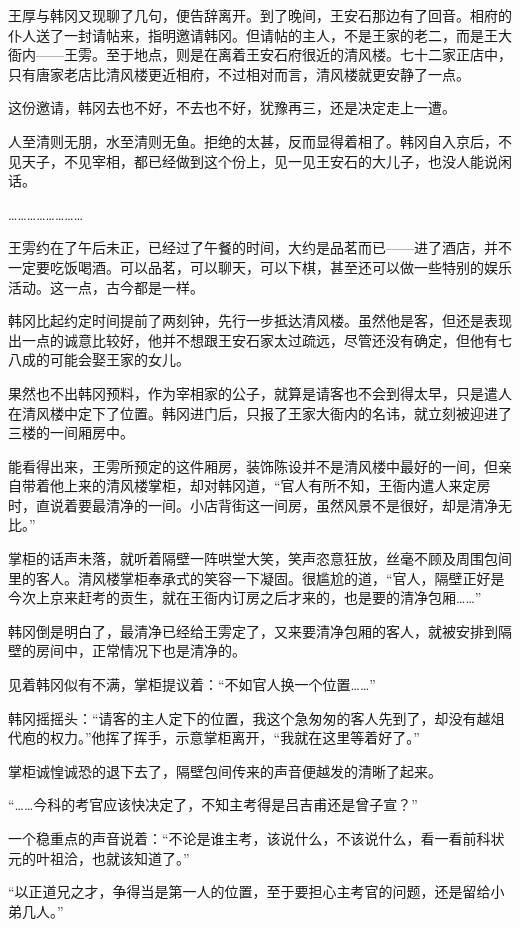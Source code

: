 王厚与韩冈又现聊了几句，便告辞离开。到了晚间，王安石那边有了回音。相府的仆人送了一封请帖来，指明邀请韩冈。但请帖的主人，不是王家的老二，而是王大衙内——王雱。至于地点，则是在离着王安石府很近的清风楼。七十二家正店中，只有唐家老店比清风楼更近相府，不过相对而言，清风楼就更安静了一点。

这份邀请，韩冈去也不好，不去也不好，犹豫再三，还是决定走上一遭。

人至清则无朋，水至清则无鱼。拒绝的太甚，反而显得着相了。韩冈自入京后，不见天子，不见宰相，都已经做到这个份上，见一见王安石的大儿子，也没人能说闲话。

……………………

王雱约在了午后未正，已经过了午餐的时间，大约是品茗而已——进了酒店，并不一定要吃饭喝酒。可以品茗，可以聊天，可以下棋，甚至还可以做一些特别的娱乐活动。这一点，古今都是一样。

韩冈比起约定时间提前了两刻钟，先行一步抵达清风楼。虽然他是客，但还是表现出一点的诚意比较好，他并不想跟王安石家太过疏远，尽管还没有确定，但他有七八成的可能会娶王家的女儿。

果然也不出韩冈预料，作为宰相家的公子，就算是请客也不会到得太早，只是遣人在清风楼中定下了位置。韩冈进门后，只报了王家大衙内的名讳，就立刻被迎进了三楼的一间厢房中。

能看得出来，王雱所预定的这件厢房，装饰陈设并不是清风楼中最好的一间，但亲自带着他上来的清风楼掌柜，却对韩冈道，“官人有所不知，王衙内遣人来定房时，直说着要最清净的一间。小店背街这一间房，虽然风景不是很好，却是清净无比。”

掌柜的话声未落，就听着隔壁一阵哄堂大笑，笑声恣意狂放，丝毫不顾及周围包间里的客人。清风楼掌柜奉承式的笑容一下凝固。很尴尬的道，“官人，隔壁正好是今次上京来赶考的贡生，就在王衙内订房之后才来的，也是要的清净包厢……”

韩冈倒是明白了，最清净已经给王雱定了，又来要清净包厢的客人，就被安排到隔壁的房间中，正常情况下也是清净的。

见着韩冈似有不满，掌柜提议着：“不如官人换一个位置……”

韩冈摇摇头：“请客的主人定下的位置，我这个急匆匆的客人先到了，却没有越俎代庖的权力。”他挥了挥手，示意掌柜离开，“我就在这里等着好了。”

掌柜诚惶诚恐的退下去了，隔壁包间传来的声音便越发的清晰了起来。

“……今科的考官应该快决定了，不知主考得是吕吉甫还是曾子宣？”

一个稳重点的声音说着：“不论是谁主考，该说什么，不该说什么，看一看前科状元的叶祖洽，也就该知道了。”

“以正道兄之才，争得当是第一人的位置，至于要担心主考官的问题，还是留给小弟几人。”

